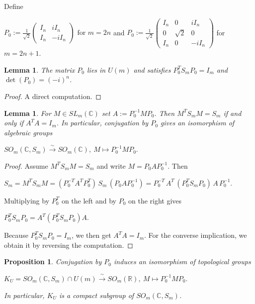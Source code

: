 \documentclass[11pt]{amsart}
\newtheorem{lemma}[theorem]{Lemma}
\newtheorem{proposition}[theorem]{Proposition}
\theoremstyle{definition}
\theoremstyle{remark}
\theoremstyle{remark}
\begin{document}
Define
\begin{center}
    $P_0 := \frac{1}{\sqrt2}\begin{pmatrix} I_n & iI_n\\ I_n & -iI_n\end{pmatrix} \text{ for } m = 2n$ and $P_0:=\frac{1}{\sqrt2}\begin{pmatrix} I_n & 0 & iI_n\\ 0 & \sqrt2 & 0\\ I_n & 0 & -iI_n\end{pmatrix}$ for $m= 2n+1$.
\end{center}
\begin{lemma}
The matrix $P_0$ lies in $U(m)$ and satisfies $P_0^T S_m P_0 = I_{m}$ and $\det(P_0)=(-i)^n$.
\end{lemma}

\begin{proof}
A direct computation.
\end{proof}

\begin{lemma} \label{lemma-conj}
For $M\in SL_{m}(\mathbb C)$ set $A := P_0^{-1} M P_0$. Then $M^T S_m M = S_m$ if and only if $A^T A = I_{m}$. 
In particular, conjugation by $P_0$ gives an isomorphism of algebraic groups
\begin{center}
$SO_{m}(\mathbb{C}, S_m)\xrightarrow{\ \sim\ } SO_{m}(\mathbb C),\
M\longmapsto P_0^{-1}MP_0 .$
\end{center}
\end{lemma}

\begin{proof}
Assume $M^T S_m M=S_m$ and write $M=P_0 A P_0^{-1}$. Then
\begin{center}
$S_m = M^T S_m M = (P_0^{-T} A^T P_0^T)\,S_m \,(P_0 A P_0^{-1})
= P_0^{-T}\,A^T\,(P_0^T S_m P_0)\,A\,P_0^{-1}.$
\end{center}
Multiplying by $P_0^T$ on the left and by $P_0$ on the right gives
\begin{center}
$P_0^T S_m P_0 = A^T (P_0^T S_m P_0) A.$
\end{center}
Because $P_0^T S_m P_0=I_{m}$, we then get $A^T A=I_{m}$. For the converse implication, we obtain it by reversing the computation.
\end{proof}

\begin{proposition} \label{K_U-compact}
Conjugation by $P_0$ induces an isomorphism of topological groups
\begin{center}
$K_U = SO_{m}(\mathbb{C}, S_m)\cap U(m)\xrightarrow{\ \sim\ } SO_{m}(\mathbb R),\
M\longmapsto P_0^{-1}MP_0 .$
\end{center}
In particular, $K_U$ is a compact subgroup of $SO_{m}(\mathbb{C}, S_m)$.
\end{proposition}
\end{document}
